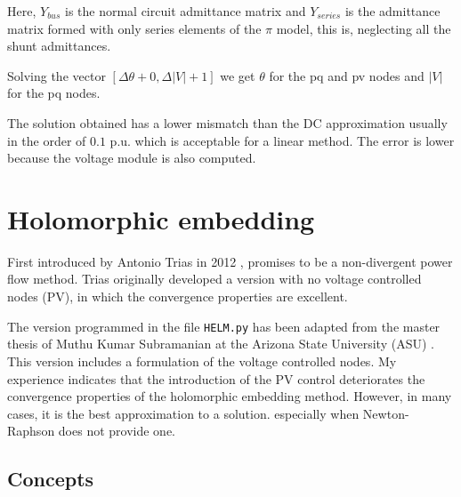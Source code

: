 \documentclass[nols,a4paper,twoside,notoc,fleqn]{tufte-book}
\begin{document}
Here, $Y_{bus}$ is the normal circuit admittance matrix and $Y_{series}$ is the admittance matrix formed with only series elements of the $\pi$ model, this is, neglecting all the shunt admittances.

Solving the vector $[\Delta \theta + 0, \Delta |V| + 1]$ we get $\theta$ for the pq and pv nodes and $|V|$ for the pq nodes.\newline

%

The solution obtained has a lower mismatch than the DC approximation usually in the order of $0.1$ p.u. which is acceptable for a linear method. The error is lower because the voltage module is also computed.

\section{Holomorphic embedding}

First introduced by Antonio Trias in 2012 \cite{TriasHELM}, promises to be a non-divergent power flow method. Trias originally developed a version with no voltage controlled nodes (PV), in which the convergence properties are excellent. 

The version programmed in the file \verb|HELM.py| has been adapted from the master thesis of Muthu Kumar Subramanian at the Arizona State University (ASU) \cite{subramanian2014application}. This version includes a formulation of the voltage controlled nodes. My experience indicates that the introduction of the PV control deteriorates the convergence properties of the holomorphic embedding method. However, in many cases, it is the best approximation to a solution. especially when Newton-Raphson does not provide one.


\subsection{Concepts}
\end{document}
